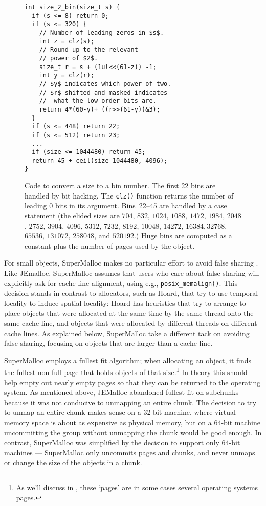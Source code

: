 \documentclass[natbib,sort&compress]{sigplanconf}
\newcommand{\code}[1]{\texttt{#1}}
\begin{document}
\begin{figure}
\begin{verbatim}
int size_2_bin(size_t s) {
  if (s <= 8) return 0;
  if (s <= 320) {
    // Number of leading zeros in $s$.
    int z = clz(s);
    // Round up to the relevant
    // power of $2$.
    size_t r = s + (1ul<<(61-z)) -1;
    int y = clz(r);
    // $y$ indicates which power of two.
    // $r$ shifted and masked indicates
    //  what the low-order bits are.
    return 4*(60-y)+ ((r>>(61-y))&3);
  }
  if (s <= 448) return 22;
  if (s <= 512) return 23;
  ...
  if (size <= 1044480) return 45;
  return 45 + ceil(size-1044480, 4096);
}
\end{verbatim}
\caption{Code to convert a size to a bin number.  The first 22 bins
  are handled by bit hacking. The \code{clz()} function returns the
  number of leading 0 bits in its argument. Bins~22--45 are handled by
  a case statement (the elided sizes are $704$, $832$, $1024$, $1088$,
  $1472$, $1984$, $2048$, $2752$, $3904$, $4096$, $5312$, $7232$,
  $8192$, $10048$, $14272$, $16384, 32768$, $65536$, $131072$,
  $258048$, and $520192$.)  Huge bins are computed as a constant plus
  the number of pages used by the object.}
\label{fig:size2bin}
\end{figure}

For small objects, SuperMalloc makes no particular effort to avoid
false sharing \cite{BoloskySc93}.  Like JEmalloc, SuperMalloc assumes
that users who care about false sharing will explicitly ask for
cache-line alignment, using e.g., \code{posix_memalign()}.  This
decision stands in contrast to allocators, such as Hoard, that try to
use temporal locality to induce spatial locality: Hoard has heuristics
that try to arrange to place objects that were allocated at the same
time by the same thread onto the same cache line, and objects that
were allocated by different threads on different cache lines.  As
explained below, SuperMalloc take a different tack on avoiding false
sharing, focusing on objects that are larger than a cache line.

SuperMalloc employs a fullest fit algorithm; when allocating an
object, it finds the fullest non-full page that holds objects of that
size.\footnote{As we'll discuss in , these `pages' are
  in some cases several operating systems pages.}  In theory this
should help empty out nearly empty pages so that they can be returned
to the operating system.  As mentioned above, JEMalloc abandoned
fullest-fit on subchunks because it was not conducive to unmapping an
entire chunk.  The decision to try to unmap an entire chunk makes
sense on a 32-bit machine, where virtual memory space is about as
expensive as physical memory, but on a 64-bit machine uncommitting the
group without unmapping the chunk would be good enough.  In contrast,
SuperMalloc was simplified by the decision to support only 64-bit
machines --- SuperMalloc only uncommits pages and chunks, and never
unmaps or change the size of the objects in a chunk.
\end{document}
